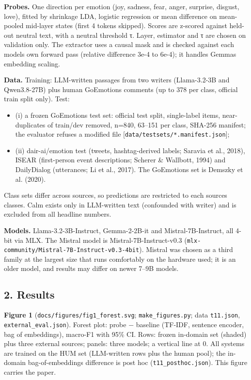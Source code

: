 \documentclass[
  10pt,
]{article}
\providecommand{\tightlist}{%
  \setlength{\itemsep}{0pt}\setlength{\parskip}{0pt}}
\begin{document}
\textbf{Probes.} One direction per emotion (joy, sadness, fear, anger,
surprise, disgust, love), fitted by shrinkage LDA, logistic regression
or mean difference on mean-pooled mid-layer states (first 4 tokens
skipped). Scores are z-scored against held-out neutral text, with a
neutral threshold τ. Layer, estimator and τ are chosen on validation
only. The extractor uses a causal mask and is checked against each
model\textquotesingle s own forward pass (relative difference 3e-4 to
6e-4); it handles Gemma\textquotesingle s embedding scaling.

\textbf{Data.} Training: LLM-written passages from two writers
(Llama-3.2-3B and Qwen3.8-27B) plus human GoEmotions comments (up to 378
per class, official train split only). Test:

\begin{itemize}
\tightlist
\item
  (i) a frozen GoEmotions test set: official test split, single-label
  items, near-duplicates of train/dev removed, n=840, 63--151 per class,
  SHA-256 manifest; the evaluator refuses a modified file
  {[}\texttt{data/testsets/*.manifest.json}{]};
\item
  (ii) dair-ai/emotion test (tweets, hashtag-derived labels; Saravia et
  al., 2018), ISEAR (first-person event descriptions; Scherer \&
  Wallbott, 1994) and DailyDialog (utterances; Li et al., 2017). The
  GoEmotions set is Demszky et al. (2020).
\end{itemize}

Class sets differ across sources, so predictions are restricted to each
source\textquotesingle s classes. Calm exists only in LLM-written text
(confounded with writer) and is excluded from all headline numbers.

\textbf{Models.} Llama-3.2-3B-Instruct, Gemma-2-2B-it and
Mistral-7B-Instruct, all 4-bit via MLX. The Mistral model is
Mistral-7B-Instruct-v0.3
(\texttt{mlx-community/Mistral-7B-Instruct-v0.3-4bit}). Mistral was
chosen as a third family at the largest size that runs comfortably on
the hardware used; it is an older model, and results may differ on newer
7--9B models.

\subsection{2. Results}\label{2-results}

\textbf{Figure 1} (\texttt{docs/figures/fig1\_forest.svg};
\texttt{make\_figures.py}; data \texttt{t11.json},
\texttt{external\_eval.json}). Forest plot: probe − baseline (TF-IDF,
sentence encoder, bag of embeddings), macro-F1 with 95\% CI. Rows:
frozen in-domain set (shaded) plus three external sources; panels: three
models; a vertical line at 0. All systems are trained on the HUM set
(LLM-written rows plus the human pool); the in-domain bag-of-embeddings
difference is post hoc (\texttt{t11\_posthoc.json}). This figure carries
the paper.
\end{document}

